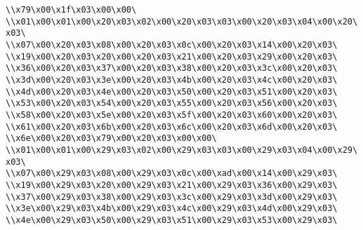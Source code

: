 \verb|\\x79\x00\x1f\x03\x00\x00\|\newline
\verb|\\x01\x00\x01\x00\x20\x03\x02\x00\x20\x03\x03\x00\x20\x03\x04\x00\x20\x03\|\newline
\verb|\\x07\x00\x20\x03\x08\x00\x20\x03\x0c\x00\x20\x03\x14\x00\x20\x03\|\newline
\verb|\\x19\x00\x20\x03\x20\x00\x20\x03\x21\x00\x20\x03\x29\x00\x20\x03\|\newline
\verb|\\x36\x00\x20\x03\x37\x00\x20\x03\x38\x00\x20\x03\x3c\x00\x20\x03\|\newline
\verb|\\x3d\x00\x20\x03\x3e\x00\x20\x03\x4b\x00\x20\x03\x4c\x00\x20\x03\|\newline
\verb|\\x4d\x00\x20\x03\x4e\x00\x20\x03\x50\x00\x20\x03\x51\x00\x20\x03\|\newline
\verb|\\x53\x00\x20\x03\x54\x00\x20\x03\x55\x00\x20\x03\x56\x00\x20\x03\|\newline
\verb|\\x58\x00\x20\x03\x5e\x00\x20\x03\x5f\x00\x20\x03\x60\x00\x20\x03\|\newline
\verb|\\x61\x00\x20\x03\x6b\x00\x20\x03\x6c\x00\x20\x03\x6d\x00\x20\x03\|\newline
\verb|\\x6e\x00\x20\x03\x79\x00\x20\x03\x00\x00\|\newline
\verb|\\x01\x00\x01\x00\x29\x03\x02\x00\x29\x03\x03\x00\x29\x03\x04\x00\x29\x03\|\newline
\verb|\\x07\x00\x29\x03\x08\x00\x29\x03\x0c\x00\xad\x00\x14\x00\x29\x03\|\newline
\verb|\\x19\x00\x29\x03\x20\x00\x29\x03\x21\x00\x29\x03\x36\x00\x29\x03\|\newline
\verb|\\x37\x00\x29\x03\x38\x00\x29\x03\x3c\x00\x29\x03\x3d\x00\x29\x03\|\newline
\verb|\\x3e\x00\x29\x03\x4b\x00\x29\x03\x4c\x00\x29\x03\x4d\x00\x29\x03\|\newline
\verb|\\x4e\x00\x29\x03\x50\x00\x29\x03\x51\x00\x29\x03\x53\x00\x29\x03\|\newline
